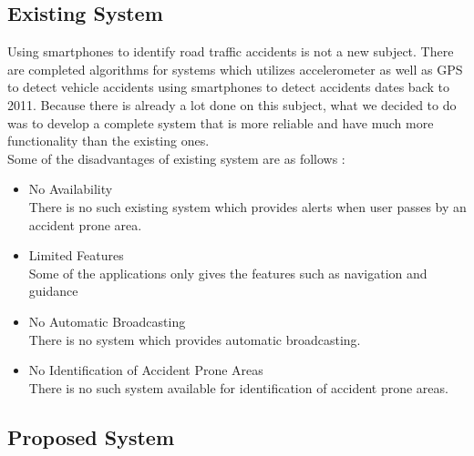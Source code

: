 \documentclass{article}
\begin{document}
\begin{flushleft}
        
        
        \newpage
        \subsection{Existing System}
        Using smartphones to identify road traffic accidents is not a
        new subject. There are completed algorithms for systems
        which utilizes accelerometer as well as GPS to detect vehicle
        accidents using smartphones to detect accidents dates back to
        2011. Because there is already a lot done on this subject, what
        we decided to do was to develop a complete system that is
        more reliable and have much more functionality than the
        existing ones.\\
        Some of the disadvantages of existing system are as follows :
        \begin{itemize}
            \item No Availability \\ There is no such existing system which provides alerts when user passes by an accident prone area.
            \item Limited Features \\ Some of the applications only gives the features such as navigation and guidance
            \item No Automatic Broadcasting \\
            There is no system which provides automatic broadcasting.
            \item No Identification of Accident Prone Areas \\
            There is no such system available for identification of accident prone areas. 
        \end{itemize}
        \newpage
        \subsection{Proposed System}
        \begin{figure}[!ht]
              

\end{figure}
\end{flushleft}
\end{document}
